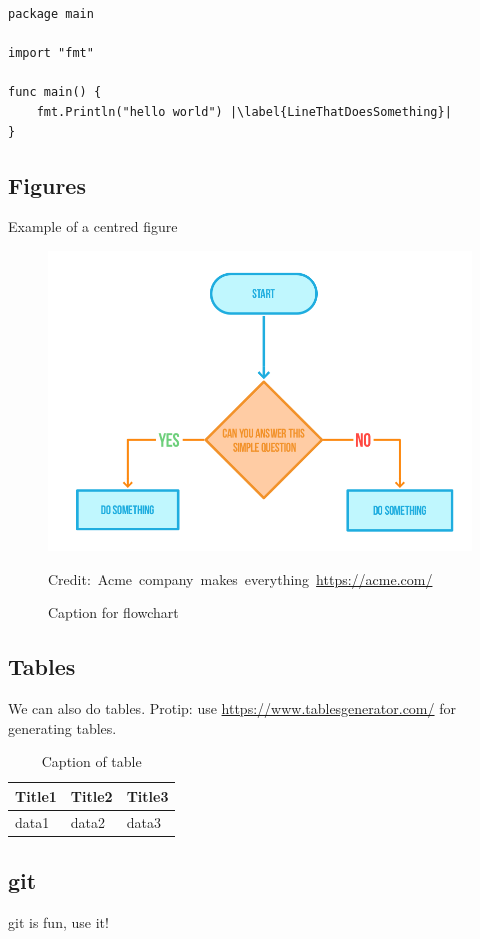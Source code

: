 \begin{lstlisting}[caption={Hello world in Golang},label=ListingGolang,escapechar=|]
package main

import "fmt"

func main() {
    fmt.Println("hello world") |\label{LineThatDoesSomething}|
}

\end{lstlisting}

\subsection{Figures}

Example of a centred figure
\begin{figure}[H]
    \centering
    \includegraphics[scale=0.5]{figures/Flowchart}
    \caption{Caption for flowchart}
  	\medskip 
	\hspace*{15pt}\hbox{\scriptsize Credit: Acme company makes everything \url{https://acme.com/}}
    \label{FlowchartFigure}
\end{figure}

\subsection{Tables}

We can also do tables. Protip: use \url{https://www.tablesgenerator.com/} for generating tables.
\begin{table}[H]
\centering
\caption{Caption of table}
\label{TableLabel}
\begin{tabular}{|l|l|l|}
\hline
Title1 & Title2 & Title3 \\ \hline
data1  & data2  & data3  \\ \hline
\end{tabular}
\end{table}

\subsection{\gls{git}}

\gls{git} is fun, use it!
